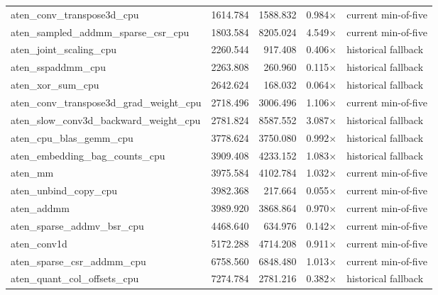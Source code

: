 \begin{longtable}{lrrrl}
  aten\_conv\_transpose3d\_cpu & 1614.784 & 1588.832 & 0.984$\times$ & current min-of-five \\
  aten\_sampled\_addmm\_sparse\_csr\_cpu & 1803.584 & 8205.024 & 4.549$\times$ & current min-of-five \\
  aten\_joint\_scaling\_cpu & 2260.544 & 917.408 & 0.406$\times$ & historical fallback \\
  aten\_sspaddmm\_cpu & 2263.808 & 260.960 & 0.115$\times$ & historical fallback \\
  aten\_xor\_sum\_cpu & 2642.624 & 168.032 & 0.064$\times$ & historical fallback \\
  aten\_conv\_transpose3d\_grad\_weight\_cpu & 2718.496 & 3006.496 & 1.106$\times$ & current min-of-five \\
  aten\_slow\_conv3d\_backward\_weight\_cpu & 2781.824 & 8587.552 & 3.087$\times$ & historical fallback \\
  aten\_cpu\_blas\_gemm\_cpu & 3778.624 & 3750.080 & 0.992$\times$ & historical fallback \\
  aten\_embedding\_bag\_counts\_cpu & 3909.408 & 4233.152 & 1.083$\times$ & historical fallback \\
  aten\_mm & 3975.584 & 4102.784 & 1.032$\times$ & current min-of-five \\
  aten\_unbind\_copy\_cpu & 3982.368 & 217.664 & 0.055$\times$ & current min-of-five \\
  aten\_addmm & 3989.920 & 3868.864 & 0.970$\times$ & current min-of-five \\
  aten\_sparse\_addmv\_bsr\_cpu & 4468.640 & 634.976 & 0.142$\times$ & current min-of-five \\
  aten\_conv1d & 5172.288 & 4714.208 & 0.911$\times$ & current min-of-five \\
  aten\_sparse\_csr\_addmm\_cpu & 6758.560 & 6848.480 & 1.013$\times$ & current min-of-five \\
  aten\_quant\_col\_offsets\_cpu & 7274.784 & 2781.216 & 0.382$\times$ & historical fallback \\
  \bottomrule
\end{longtable}
